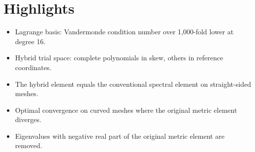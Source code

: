 \documentclass[11pt,a4paper]{article}
\begin{document}
\section*{Highlights}
\begin{itemize}
  \item Lagrange basis: Vandermonde condition number over 1,000-fold lower at degree 16.
  \item Hybrid trial space: complete polynomials in skew, others in reference coordinates.
  \item The hybrid element equals the conventional spectral element on straight-sided meshes.
  \item Optimal convergence on curved meshes where the original metric element diverges.
  \item Eigenvalues with negative real part of the original metric element are removed.
\end{itemize}
\end{document}
